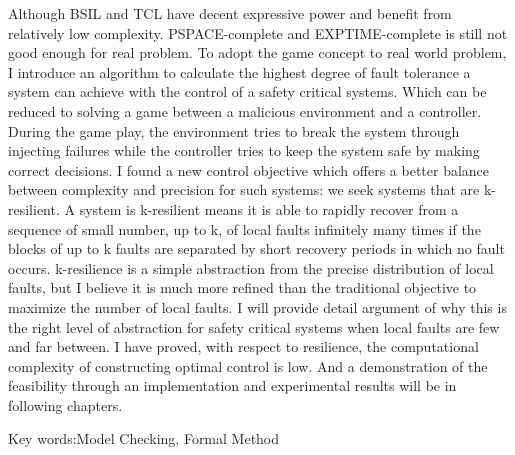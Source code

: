 \begin{abstractEN}
Although BSIL and TCL have decent expressive power and benefit from relatively low complexity. PSPACE-complete and EXPTIME-complete is still not good enough for real problem. To adopt the game concept to real world problem, I introduce an algorithm to calculate the highest degree of fault tolerance a system can achieve with the control of a safety critical systems. Which can be reduced to solving a game between a malicious environment and a controller. During the game play, the environment tries to break the system through injecting failures while the controller tries to keep the system safe by making correct decisions. I found a new control objective which offers a better balance between complexity and precision for such systems: we seek systems that are k-resilient. A system is k-resilient means it is able to rapidly recover from a sequence of small number, up to k, of local faults infinitely many times if the blocks of up to k faults are separated by short recovery periods in which no fault occurs. k-resilience is a simple abstraction from the precise distribution of local faults, but I believe it is much more refined than the traditional objective to maximize the number of local faults. I will provide detail argument of why this is the right level of abstraction for safety critical systems when local faults are few and far between. I have proved, with respect to resilience, the computational complexity of constructing optimal control is low. And a demonstration of the feasibility through an implementation and experimental results will be in following chapters.

Key words:Model Checking, Formal Method

\end{abstractEN}
